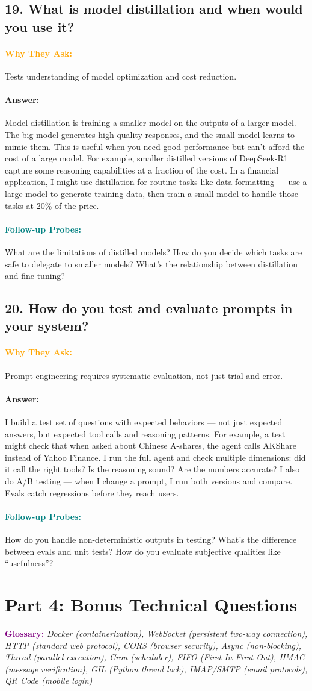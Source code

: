 \documentclass[11pt,a4paper]{article}
\newcommand{\Q}[1]{\subsection{#1}}
\newcommand{\Ans}[1]{\paragraph{\textbf{Answer:}} #1}
\newcommand{\Why}{\paragraph{\textcolor{orange}{\textbf{Why They Ask:}}}}
\newcommand{\Probe}{\paragraph{\textcolor{teal}{\textbf{Follow-up Probes:}}}}
\begin{document}
\Q{19. What is model distillation and when would you use it?}
\Why Tests understanding of model optimization and cost reduction.
\Ans Model distillation is training a smaller model on the outputs of a larger model. The big model generates high-quality responses, and the small model learns to mimic them. This is useful when you need good performance but can't afford the cost of a large model. For example, smaller distilled versions of DeepSeek-R1 capture some reasoning capabilities at a fraction of the cost. In a financial application, I might use distillation for routine tasks like data formatting --- use a large model to generate training data, then train a small model to handle those tasks at 20\% of the price.
\Probe What are the limitations of distilled models? How do you decide which tasks are safe to delegate to smaller models? What's the relationship between distillation and fine-tuning?

\Q{20. How do you test and evaluate prompts in your system?}
\Why Prompt engineering requires systematic evaluation, not just trial and error.
\Ans I build a test set of questions with expected behaviors --- not just expected answers, but expected tool calls and reasoning patterns. For example, a test might check that when asked about Chinese A-shares, the agent calls AKShare instead of Yahoo Finance. I run the full agent and check multiple dimensions: did it call the right tools? Is the reasoning sound? Are the numbers accurate? I also do A/B testing --- when I change a prompt, I run both versions and compare. Evals catch regressions before they reach users.
\Probe How do you handle non-deterministic outputs in testing? What's the difference between evals and unit tests? How do you evaluate subjective qualities like ``usefulness''?

\newpage
\section{Part 4: Bonus Technical Questions}

\textcolor{purple}{\textbf{Glossary:}} \textit{Docker (containerization), WebSocket (persistent two-way connection), HTTP (standard web protocol), CORS (browser security), Async (non-blocking), Thread (parallel execution), Cron (scheduler), FIFO (First In First Out), HMAC (message verification), GIL (Python thread lock), IMAP/SMTP (email protocols), QR Code (mobile login)}
\end{document}
